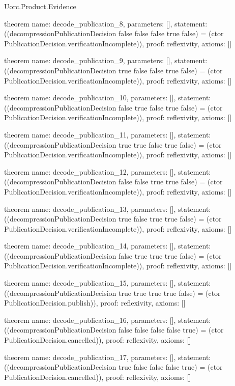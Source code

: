 \begin{lexlean}{Uorc.Product.Evidence}
\begin{semanticmodule}
theorem{
  name: decode_publication_8,
  parameters: [],
  statement: ((decompressionPublicationDecision false false false true false) = (ctor PublicationDecision.verificationIncomplete)),
  proof: reflexivity{},
  axioms: []
}

theorem{
  name: decode_publication_9,
  parameters: [],
  statement: ((decompressionPublicationDecision true false false true false) = (ctor PublicationDecision.verificationIncomplete)),
  proof: reflexivity{},
  axioms: []
}

theorem{
  name: decode_publication_10,
  parameters: [],
  statement: ((decompressionPublicationDecision false true false true false) = (ctor PublicationDecision.verificationIncomplete)),
  proof: reflexivity{},
  axioms: []
}

theorem{
  name: decode_publication_11,
  parameters: [],
  statement: ((decompressionPublicationDecision true true false true false) = (ctor PublicationDecision.verificationIncomplete)),
  proof: reflexivity{},
  axioms: []
}

theorem{
  name: decode_publication_12,
  parameters: [],
  statement: ((decompressionPublicationDecision false false true true false) = (ctor PublicationDecision.verificationIncomplete)),
  proof: reflexivity{},
  axioms: []
}

theorem{
  name: decode_publication_13,
  parameters: [],
  statement: ((decompressionPublicationDecision true false true true false) = (ctor PublicationDecision.verificationIncomplete)),
  proof: reflexivity{},
  axioms: []
}

theorem{
  name: decode_publication_14,
  parameters: [],
  statement: ((decompressionPublicationDecision false true true true false) = (ctor PublicationDecision.verificationIncomplete)),
  proof: reflexivity{},
  axioms: []
}

theorem{
  name: decode_publication_15,
  parameters: [],
  statement: ((decompressionPublicationDecision true true true true false) = (ctor PublicationDecision.publish)),
  proof: reflexivity{},
  axioms: []
}

theorem{
  name: decode_publication_16,
  parameters: [],
  statement: ((decompressionPublicationDecision false false false false true) = (ctor PublicationDecision.cancelled)),
  proof: reflexivity{},
  axioms: []
}

theorem{
  name: decode_publication_17,
  parameters: [],
  statement: ((decompressionPublicationDecision true false false false true) = (ctor PublicationDecision.cancelled)),
  proof: reflexivity{},
  axioms: []
}


\end{semanticmodule}
\end{lexlean}
